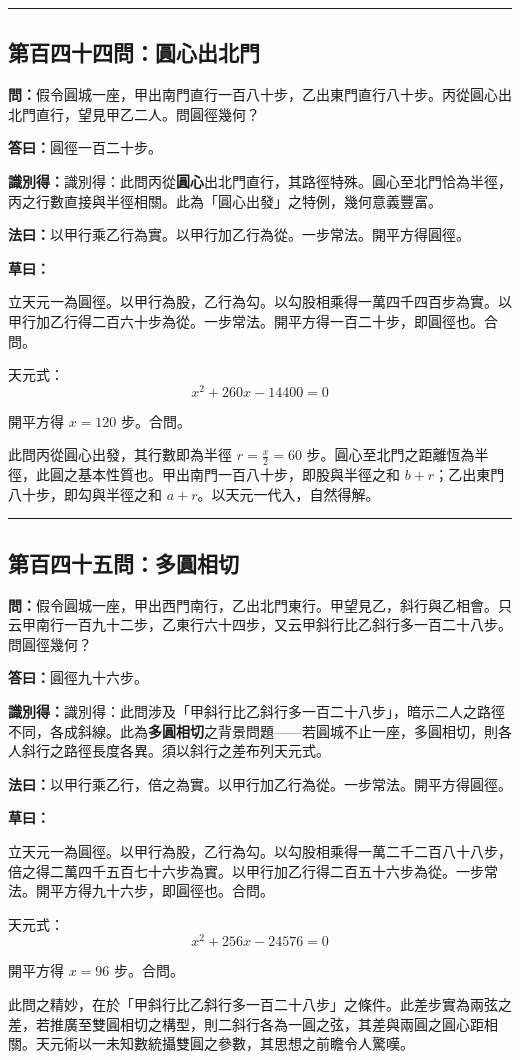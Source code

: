 \documentclass[11pt,a4paper]{article}
\newcommand{\longline}{\noindent\rule{\textwidth}{0.4pt}}
\newcommand{\wen}[1]{\par\noindent\textbf{\textcolor{probcolor}{問：}}{#1}\par}
\newcommand{\da}[1]{\par\noindent\textbf{\textcolor{anscolor}{答曰：}}{#1}\par}
\newcommand{\fayue}[1]{\par\noindent\textbf{\textcolor{methodcolor}{法曰：}}{#1}\par}
\newcommand{\caoyue}[1]{\par\noindent\textbf{草曰：}{#1}\par}
\newcommand{\zhi}[1]{\par\noindent\textbf{識別得：}{#1}\par}
\begin{document}
\vspace{0.5cm}
\longline

\subsection*{第百四十四問：圓心出北門}
\wen{假令圓城一座，甲出南門直行一百八十步，乙出東門直行八十步。丙從圓心出北門直行，望見甲乙二人。問圓徑幾何？}

\da{圓徑一百二十步。}

\zhi{識別得：此問丙從\textbf{圓心}出北門直行，其路徑特殊。圓心至北門恰為半徑，丙之行數直接與半徑相關。此為「圓心出發」之特例，幾何意義豐富。}

\fayue{以甲行乘乙行為實。以甲行加乙行為從。一步常法。開平方得圓徑。}

\caoyue{
立天元一為圓徑。以甲行為股，乙行為勾。以勾股相乘得一萬四千四百步為實。以甲行加乙行得二百六十步為從。一步常法。開平方得一百二十步，即圓徑也。合問。

天元式：
$$x^2 + 260x - 14400 = 0$$

開平方得 $x = 120$ 步。合問。

此問丙從圓心出發，其行數即為半徑 $r = \frac{x}{2} = 60$ 步。圓心至北門之距離恆為半徑，此圓之基本性質也。甲出南門一百八十步，即股與半徑之和 $b + r$；乙出東門八十步，即勾與半徑之和 $a + r$。以天元一代入，自然得解。
}

\vspace{0.5cm}
\longline

\subsection*{第百四十五問：多圓相切}
\wen{假令圓城一座，甲出西門南行，乙出北門東行。甲望見乙，斜行與乙相會。只云甲南行一百九十二步，乙東行六十四步，又云甲斜行比乙斜行多一百二十八步。問圓徑幾何？}

\da{圓徑九十六步。}

\zhi{識別得：此問涉及「甲斜行比乙斜行多一百二十八步」，暗示二人之路徑不同，各成斜線。此為\textbf{多圓相切}之背景問題——若圓城不止一座，多圓相切，則各人斜行之路徑長度各異。須以斜行之差布列天元式。}

\fayue{以甲行乘乙行，倍之為實。以甲行加乙行為從。一步常法。開平方得圓徑。}

\caoyue{
立天元一為圓徑。以甲行為股，乙行為勾。以勾股相乘得一萬二千二百八十八步，倍之得二萬四千五百七十六步為實。以甲行加乙行得二百五十六步為從。一步常法。開平方得九十六步，即圓徑也。合問。

天元式：
$$x^2 + 256x - 24576 = 0$$

開平方得 $x = 96$ 步。合問。

此問之精妙，在於「甲斜行比乙斜行多一百二十八步」之條件。此差步實為兩弦之差，若推廣至雙圓相切之構型，則二斜行各為一圓之弦，其差與兩圓之圓心距相關。天元術以一未知數統攝雙圓之參數，其思想之前瞻令人驚嘆。
}
\end{document}
